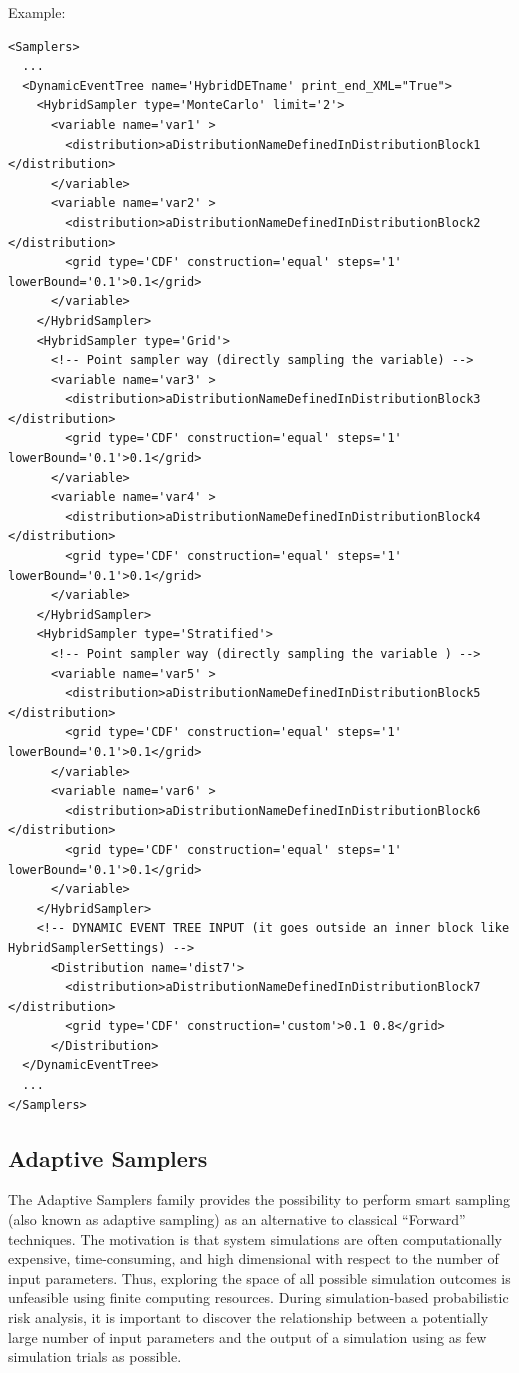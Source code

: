 Example:
\begin{lstlisting}[style=XML]
<Samplers>
  ...
  <DynamicEventTree name='HybridDETname' print_end_XML="True">
    <HybridSampler type='MonteCarlo' limit='2'>
      <variable name='var1' >
        <distribution>aDistributionNameDefinedInDistributionBlock1 </distribution>
      </variable>
      <variable name='var2' >
        <distribution>aDistributionNameDefinedInDistributionBlock2 </distribution>
        <grid type='CDF' construction='equal' steps='1' lowerBound='0.1'>0.1</grid>
      </variable>
    </HybridSampler>
    <HybridSampler type='Grid'>
      <!-- Point sampler way (directly sampling the variable) -->
      <variable name='var3' >
        <distribution>aDistributionNameDefinedInDistributionBlock3 </distribution>
        <grid type='CDF' construction='equal' steps='1' lowerBound='0.1'>0.1</grid>
      </variable>
      <variable name='var4' >
        <distribution>aDistributionNameDefinedInDistributionBlock4 </distribution>
        <grid type='CDF' construction='equal' steps='1' lowerBound='0.1'>0.1</grid>
      </variable>
    </HybridSampler>
    <HybridSampler type='Stratified'>
      <!-- Point sampler way (directly sampling the variable ) -->
      <variable name='var5' >
        <distribution>aDistributionNameDefinedInDistributionBlock5 </distribution>
        <grid type='CDF' construction='equal' steps='1' lowerBound='0.1'>0.1</grid>
      </variable>
      <variable name='var6' >
        <distribution>aDistributionNameDefinedInDistributionBlock6 </distribution>
        <grid type='CDF' construction='equal' steps='1' lowerBound='0.1'>0.1</grid>
      </variable>
    </HybridSampler>
    <!-- DYNAMIC EVENT TREE INPUT (it goes outside an inner block like HybridSamplerSettings) -->
      <Distribution name='dist7'>
        <distribution>aDistributionNameDefinedInDistributionBlock7 </distribution>
        <grid type='CDF' construction='custom'>0.1 0.8</grid>
      </Distribution>
  </DynamicEventTree>
  ...
</Samplers>
\end{lstlisting}

\subsection{Adaptive Samplers}
\label{subsec:AdaptSamplers}
The Adaptive Samplers family provides the possibility to perform smart sampling
(also known as adaptive sampling) as an alternative to classical ``Forward''
techniques.
%
The motivation is that system simulations are often computationally expensive,
time-consuming, and high dimensional with respect to the number of input
parameters.
%
Thus, exploring the space of all possible simulation outcomes is unfeasible
using finite computing resources.
%
During simulation-based probabilistic risk analysis, it is important to discover
the relationship between a potentially large number of input parameters and the
output of a simulation using as few simulation trials as possible.

